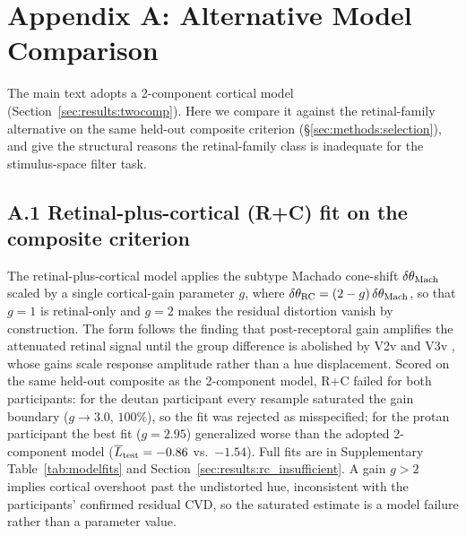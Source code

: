 
\section*{Appendix A: Alternative Model Comparison}
\label{app:altmodels}

The main text adopts a 2-component cortical model (Section~\ref{sec:results:twocomp}). Here we compare it against the retinal-family alternative on the same held-out composite criterion (\S\ref{sec:methods:selection}), and give the structural reasons the retinal-family class is inadequate for the stimulus-space filter task.

\subsection*{A.1 Retinal-plus-cortical (R+C) fit on the composite criterion}

The retinal-plus-cortical model applies the subtype Machado cone-shift $\delta\theta_{\rm Mach}$ \citealp{machado2009} scaled by a single cortical-gain parameter $g$, where $\delta\theta_{\rm RC} = (2 - g)\,\delta\theta_{\rm Mach}$, so that $g = 1$ is retinal-only and $g = 2$ makes the residual distortion vanish by construction. The form follows the finding that post-receptoral gain amplifies the attenuated retinal signal until the group difference is abolished by V2v and V3v \citealp{tregillus2021}, whose gains scale response amplitude rather than a hue displacement. Scored on the same held-out composite as the 2-component model, R+C failed for both participants: for the deutan participant every resample saturated the gain boundary ($g \to 3.0$, $100\%$), so the fit was rejected as misspecified; for the protan participant the best fit ($g = 2.95$) generalized worse than the adopted 2-component model ($\overline{L}_{\rm test} = -0.86$ vs.\ $-1.54$). Full fits are in Supplementary Table~\ref{tab:modelfits} and Section~\ref{sec:results:rc_insufficient}. A gain $g > 2$ implies cortical overshoot past the undistorted hue, inconsistent with the participants' confirmed residual CVD, so the saturated estimate is a model failure rather than a parameter value.

